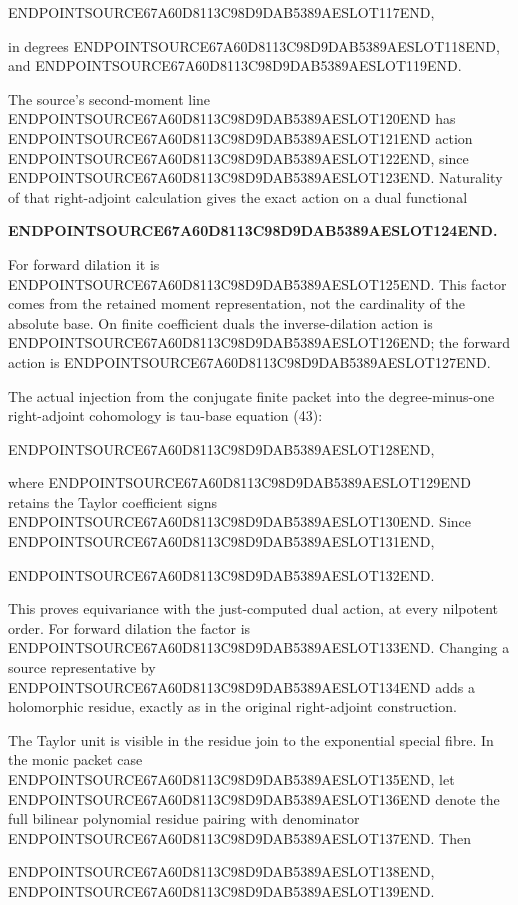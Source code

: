 ENDPOINTSOURCE67A60D8113C98D9DAB5389AESLOT117END,

in degrees ENDPOINTSOURCE67A60D8113C98D9DAB5389AESLOT118END, and ENDPOINTSOURCE67A60D8113C98D9DAB5389AESLOT119END.

The source's second-moment line ENDPOINTSOURCE67A60D8113C98D9DAB5389AESLOT120END has ENDPOINTSOURCE67A60D8113C98D9DAB5389AESLOT121END action ENDPOINTSOURCE67A60D8113C98D9DAB5389AESLOT122END, since ENDPOINTSOURCE67A60D8113C98D9DAB5389AESLOT123END. Naturality of that right-adjoint calculation gives the exact action on a dual functional

\textbf{ENDPOINTSOURCE67A60D8113C98D9DAB5389AESLOT124END.}

For forward dilation it is ENDPOINTSOURCE67A60D8113C98D9DAB5389AESLOT125END. This factor comes from the retained moment representation, not the cardinality of the absolute base. On finite coefficient duals the inverse-dilation action is ENDPOINTSOURCE67A60D8113C98D9DAB5389AESLOT126END; the forward action is ENDPOINTSOURCE67A60D8113C98D9DAB5389AESLOT127END.

The actual injection from the conjugate finite packet into the degree-minus-one right-adjoint cohomology is tau-base equation (43):

ENDPOINTSOURCE67A60D8113C98D9DAB5389AESLOT128END,

where ENDPOINTSOURCE67A60D8113C98D9DAB5389AESLOT129END retains the Taylor coefficient signs ENDPOINTSOURCE67A60D8113C98D9DAB5389AESLOT130END. Since ENDPOINTSOURCE67A60D8113C98D9DAB5389AESLOT131END,

ENDPOINTSOURCE67A60D8113C98D9DAB5389AESLOT132END.

This proves equivariance with the just-computed dual action, at every nilpotent order. For forward dilation the factor is ENDPOINTSOURCE67A60D8113C98D9DAB5389AESLOT133END. Changing a source representative by ENDPOINTSOURCE67A60D8113C98D9DAB5389AESLOT134END adds a holomorphic residue, exactly as in the original right-adjoint construction.

The Taylor unit is visible in the residue join to the exponential special fibre. In the monic packet case ENDPOINTSOURCE67A60D8113C98D9DAB5389AESLOT135END, let ENDPOINTSOURCE67A60D8113C98D9DAB5389AESLOT136END denote the full bilinear polynomial residue pairing with denominator ENDPOINTSOURCE67A60D8113C98D9DAB5389AESLOT137END. Then

ENDPOINTSOURCE67A60D8113C98D9DAB5389AESLOT138END, ENDPOINTSOURCE67A60D8113C98D9DAB5389AESLOT139END.

